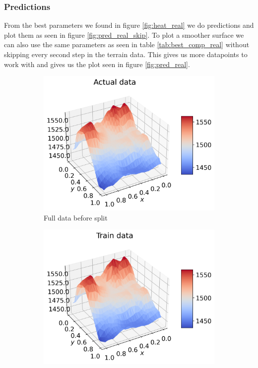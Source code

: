 \documentclass[12pt]{article}
\begin{document}
\subsubsection{Predictions}
From the best parameters we found in figure \ref{fig:heat_real} we do predictions and plot them as seen in figure \ref{fig:pred_real_skip}. To plot a smoother surface we can also use the same parameters as seen in table \ref{tab:best_comp_real} without skipping every second step in the terrain data. This gives us more datapoints to work with and gives us the plot seen in figure \ref{fig:pred_real}.
\begin{figure}[H]
  \begin{subfigure}{.5\textwidth}
    \centering
    \includegraphics[width=\textwidth]{../figures/actual_data_n40_skip2.png}
    \caption{Full data before split}
    \label{fig:real_pred_real_skip}
  \end{subfigure}
  \begin{subfigure}{.5\textwidth}
    \centering
    \includegraphics[width=\textwidth]{../figures/train_data_n40_skip2.png}

\end{subfigure}
\end{figure}
\end{document}
